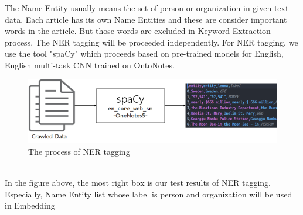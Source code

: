 The Name Entity usually means the set of person or organization in given text data. Each article has its own Name Entities and these are consider important words in the article. But those words are excluded in Keyword Extraction process. The NER tagging will be proceeded independently. For NER tagging, we use the tool "spaCy" which proceeds based on pre-trained models for English, English multi-task CNN trained on OntoNotes.
\begin{figure}[htp]
    \centering            
    \includegraphics[width=\textwidth]{02_02_ner_tagging.png} 
    \caption{The process of NER tagging} 
    \label{fig:NER tagging} 
\end{figure}\\
In the figure above, the most right box is our test results of NER tagging. Especially, Name Entity list whose label is person and organization will be used in Embedding 